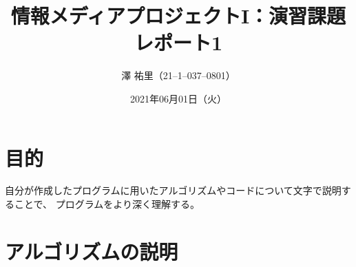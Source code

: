 \documentclass{jsarticle}
\title{情報メディアプロジェクトI：演習課題レポート1}
\author{澤 \/ 祐里（21--1--037--0801）} %
\date{2021年06月01日（火）} %
\begin{document}
\maketitle

\section{目的}
自分が作成したプログラムに用いたアルゴリズムやコードについて文字で説明することで、
プログラムをより深く理解する。

\section{アルゴリズムの説明}
\end{document}
